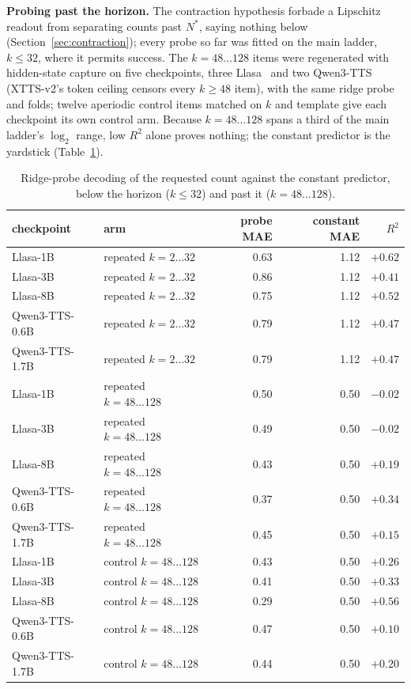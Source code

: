 \noindent\textbf{Probing past the horizon.} The contraction hypothesis
forbade a Lipschitz readout from separating counts past $N^\ast$,
saying nothing below (Section~\ref{sec:contraction}); every probe so
far was fitted on the main ladder, $k\le32$, where it permits success.
The $k=48\ldots128$ items were regenerated with hidden-state capture on
five checkpoints, three Llasa~\cite{ye2025llasa} and two
Qwen3-TTS~\cite{hu2026qwen3tts} (XTTS-v2's token ceiling censors every
$k\ge48$ item), with the same ridge probe and folds; twelve aperiodic
control items matched on $k$ and template give each checkpoint its own
control arm. Because $k=48\ldots128$ spans a third of the main ladder's
$\log_2$ range, low $R^2$ alone proves nothing; the constant predictor
is the yardstick (Table~\ref{tab:probeladders}).
\begin{table}[tp]\centering
\caption{Ridge-probe decoding of the requested count against the constant predictor, below the horizon ($k\le32$) and past it ($k=48\ldots128$).}
\label{tab:probeladders}
\begin{tabular}{llrrr}
\toprule
checkpoint & arm & probe MAE & constant MAE & $R^2$ \\
\midrule
Llasa-1B       & repeated $k=2\ldots32$    & 0.63 & 1.12 & $+0.62$ \\
Llasa-3B       & repeated $k=2\ldots32$    & 0.86 & 1.12 & $+0.41$ \\
Llasa-8B       & repeated $k=2\ldots32$    & 0.75 & 1.12 & $+0.52$ \\
Qwen3-TTS-0.6B & repeated $k=2\ldots32$    & 0.79 & 1.12 & $+0.47$ \\
Qwen3-TTS-1.7B & repeated $k=2\ldots32$    & 0.79 & 1.12 & $+0.47$ \\
\midrule
Llasa-1B       & repeated $k=48\ldots128$  & 0.50 & 0.50 & $-0.02$ \\
Llasa-3B       & repeated $k=48\ldots128$  & 0.49 & 0.50 & $-0.02$ \\
Llasa-8B       & repeated $k=48\ldots128$  & 0.43 & 0.50 & $+0.19$ \\
Qwen3-TTS-0.6B & repeated $k=48\ldots128$  & 0.37 & 0.50 & $+0.34$ \\
Qwen3-TTS-1.7B & repeated $k=48\ldots128$  & 0.45 & 0.50 & $+0.15$ \\
\midrule
Llasa-1B       & control $k=48\ldots128$   & 0.43 & 0.50 & $+0.26$ \\
Llasa-3B       & control $k=48\ldots128$   & 0.41 & 0.50 & $+0.33$ \\
Llasa-8B       & control $k=48\ldots128$   & 0.29 & 0.50 & $+0.56$ \\
Qwen3-TTS-0.6B & control $k=48\ldots128$   & 0.47 & 0.50 & $+0.10$ \\
Qwen3-TTS-1.7B & control $k=48\ldots128$   & 0.44 & 0.50 & $+0.20$ \\
\bottomrule
\end{tabular}
\end{table}
